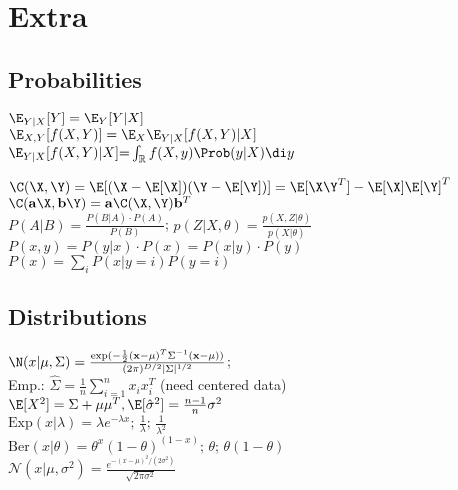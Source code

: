 \section*{Extra}
\subsection*{Probabilities}
$\E_{Y|X}[Y]=\E_{Y}[Y|X]$\\
$\E_{X,Y}[f(X,Y)]=\E_{X}\E_{Y|X}[f(X,Y)|X]$
$\E_{Y|X}[f(X,Y)|X]{=}\int_\mathbb{R}f(X,y)\Prob(y|X)\di y$


$\C(\X,\Y)=\E[(\X-\E[\X])(\Y-\E[\Y])] = \E[\X\Y^T]-\E[\X]\E[\Y]^T$ \\
$\C(\mathbf{a}\X,\mathbf{b}\Y)=\mathbf{a}\C(\X,\Y)\mathbf{b}^T$\\
$P(A|B) = \frac{P(B|A) \cdot P(A)}{P(B)}$; $p(Z|X,\theta) = \frac{p(X,Z|\theta)}{p(X|\theta)}$\\
$P(x,y) = P(y|x) \cdot  P(x) = P(x|y) \cdot P(y)$
$P(x)=\sum_i P(x|y=i)P(y=i)$
\subsection*{Distributions}
$\N(x|\mu, \Sigma)= \frac{\exp(-\frac{1}{2}(\mathbf{x}-\mu)^T\Sigma^{-1}(\mathbf{x}-\mu))}{(2\pi)^{D/2}|\Sigma|^{1/2}}$;\\
Emp.: $\hat{\Sigma} = \frac{1}{n}\sum_{i=1}^n x_i x_i^T$ (need centered data)\\
$\E[X^2]= \Sigma+ \mu\mu^T, \E[\hat{\sigma}^2]=\frac{n-1}{n}\sigma^2 $\\
$\mathrm{Exp}(x|\lambda){=}\lambda e^{-\lambda x}; \, \frac{1}{\lambda}; \, \frac{1}{\lambda^2}$\\
$\mathrm{Ber}(x|\theta){=}\theta^x (1{-}\theta)^{(1-x)}; \, \theta; \, \theta(1-\theta)$\\
$\mathcal{N}(x|\mu, \sigma^2)=\frac{e^{-(x-\mu)^2/(2\sigma^2)}}{\sqrt{2\pi\sigma^2}}$
